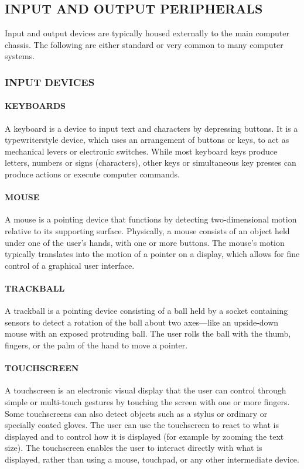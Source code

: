 \documentclass[a4paper,28pt,twoside,openright]{report}
\begin{document}
\subsection*{INPUT AND OUTPUT PERIPHERALS}
	Input and output devices are typically housed externally to the main computer chassis. The following are either
	standard or very common to many computer systems.
\subsubsection*{INPUT DEVICES}
	\paragraph{KEYBOARDS}
		 A keyboard is a device to input text and characters by depressing buttons. It is a typewriterstyle
	device, which uses an arrangement of buttons or keys, to act as mechanical levers or electronic
	switches. While most keyboard keys produce letters, numbers or signs (characters), other keys or
	simultaneous key presses can produce actions or execute computer commands.
	\paragraph{MOUSE}
	 A mouse is a pointing device that functions by detecting two-dimensional motion relative to its
	supporting surface. Physically, a mouse consists of an object held under one of the user's hands, with
	one or more buttons. The mouse's motion typically translates into the motion of a pointer on a display,
	which allows for fine control of a graphical user interface. 
	\paragraph{TRACKBALL}
	 A trackball is a pointing device consisting of a ball held by a socket containing sensors to
	detect a rotation of the ball about two axes—like an upside-down mouse with an exposed protruding
	ball. The user rolls the ball with the thumb, fingers, or the palm of the hand to move a pointer.
	\paragraph{TOUCHSCREEN}
	 A touchscreen is an electronic visual display that the user can control through simple
	or multi-touch gestures by touching the screen with one or more fingers. Some touchscreens can also
	detect objects such as a stylus or ordinary or specially coated gloves. The user can use the touchscreen
	to react to what is displayed and to control how it is displayed (for example by zooming the text size).
		The touchscreen enables the user to interact directly with what is displayed, rather than using
	a mouse, touchpad, or any other intermediate device. 
\end{document}
